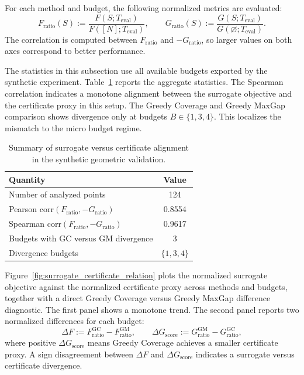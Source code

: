 \documentclass[accepted]{uai2026}
\theoremstyle{plain}
\theoremstyle{definition}
\theoremstyle{remark}
\begin{document}
For each method and budget, the following normalized metrics are evaluated:
\[
F_{\mathrm{ratio}}(S)
:= \frac{F(S;T_{\mathrm{eval}})}{F([N];T_{\mathrm{eval}})},
\qquad
G_{\mathrm{ratio}}(S)
:= \frac{G(S;T_{\mathrm{eval}})}{G(\varnothing;T_{\mathrm{eval}})}.
\]
The correlation is computed between $F_{\mathrm{ratio}}$ and $-G_{\mathrm{ratio}}$, so larger values on both axes correspond to better performance.

The statistics in this subsection use all available budgets exported by the synthetic experiment. Table~\ref{tab:surrogate_certificate_summary} reports the aggregate statistics. The Spearman correlation indicates a monotone alignment between the surrogate objective and the certificate proxy in this setup. The Greedy Coverage and Greedy MaxGap comparison shows divergence only at budgets $B \in \{1,3,4\}$. This localizes the mismatch to the micro budget regime.

\begin{table}[!h]
\centering
\caption{Summary of surrogate versus certificate alignment in the synthetic geometric validation.}
\label{tab:surrogate_certificate_summary}
\small
\begin{tabular}{l c}
\hline
Quantity & Value \\
\hline
Number of analyzed points & 124 \\
Pearson corr$(F_{\mathrm{ratio}}, -G_{\mathrm{ratio}})$ & 0.8554 \\
Spearman corr$(F_{\mathrm{ratio}}, -G_{\mathrm{ratio}})$ & 0.9617 \\
Budgets with GC versus GM divergence & 3 \\
Divergence budgets & $\{1,3,4\}$ \\
\hline
\end{tabular}
\end{table}

Figure~\ref{fig:surrogate_certificate_relation} plots the normalized surrogate objective against the normalized certificate proxy across methods and budgets, together with a direct Greedy Coverage versus Greedy MaxGap difference diagnostic. The first panel shows a monotone trend. The second panel reports two normalized differences for each budget:
\[
\Delta F := F_{\mathrm{ratio}}^{\mathrm{GC}} - F_{\mathrm{ratio}}^{\mathrm{GM}},
\qquad
\Delta G_{\mathrm{score}} := G_{\mathrm{ratio}}^{\mathrm{GM}} - G_{\mathrm{ratio}}^{\mathrm{GC}},
\]
where positive $\Delta G_{\mathrm{score}}$ means Greedy Coverage achieves a smaller certificate proxy. A sign disagreement between $\Delta F$ and $\Delta G_{\mathrm{score}}$ indicates a surrogate versus certificate divergence.
\end{document}
